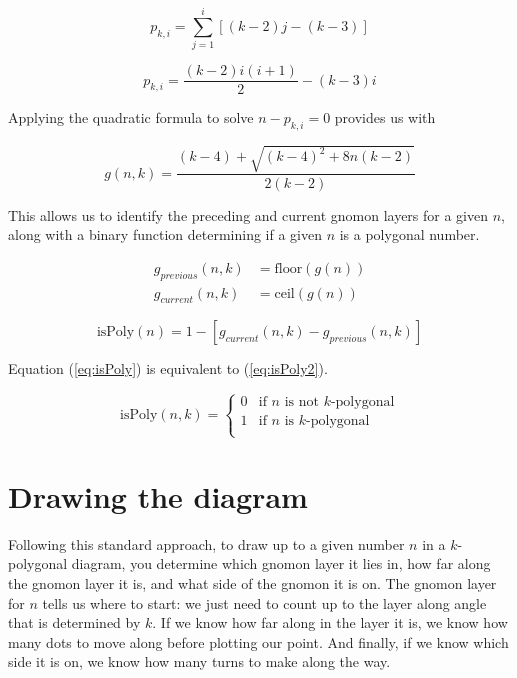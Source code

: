 \documentclass[notitlepage]{report}
\begin{document}
\begin{equation}
    p_{k,i} = \sum^{i}_{j=1}\left[(k-2)j-(k-3)\right]
    \label{eq:summation}
\end{equation}

\begin{equation}
    p_{k,i} = \frac{(k-2)i(i+1)}{2} - (k-3)i
    \label{eq:quad}
\end{equation}

Applying the quadratic formula to solve $n-p_{k,i}=0$ provides us with

\begin{equation}
    g\left(n,k\right)=\frac{\left(k-4\right)+\sqrt{\left(k-4\right)^{2}+8n\left(k-2\right)}}{2\left(k-2\right)}
     \label{eq:quadform}
\end{equation}

This allows us to identify the preceding and current gnomon layers for a given $n$, along with a binary function determining if a given $n$ is a polygonal number.

\begin{align}
    g_{previous}\left(n,k\right) &= \text{floor}\left(g\left(n\right)\right) \\
    g_{current}\left(n,k\right) &= \text{ceil}\left(g\left(n\right)\right)    
    \label{eq:prev-and-current}
\end{align}

\begin{equation}
    \text{isPoly}\left(n\right) = 1 - \left[ g_{current}\left(n,k\right) - g_{previous}\left(n,k\right) \right]
    \label{eq:isPoly}
\end{equation}

Equation (\ref{eq:isPoly}) is equivalent to (\ref{eq:isPoly2}).

\begin{equation}
 \text{isPoly}\left(n,k\right) =
    \begin{cases}
      0 & \text{if $n$ is not $k$-polygonal}\\
      1 & \text{if $n$ is $k$-polygonal}\\
    \end{cases} 
    \label{eq:isPoly2}
\end{equation}

\section*{Drawing the diagram}
Following this standard approach, to draw up to a given number $n$ in a $k$-polygonal diagram, you determine which gnomon layer it lies in, how far along the gnomon layer it is, and what side of the gnomon it is on. The gnomon layer for $n$ tells us where to start: we just need to count up to the layer along angle that is determined by $k$. If we know how far along in the layer it is, we know how many dots to move along before plotting our point. And finally, if we know which side it is on, we know how many turns to make along the way.
\end{document}
